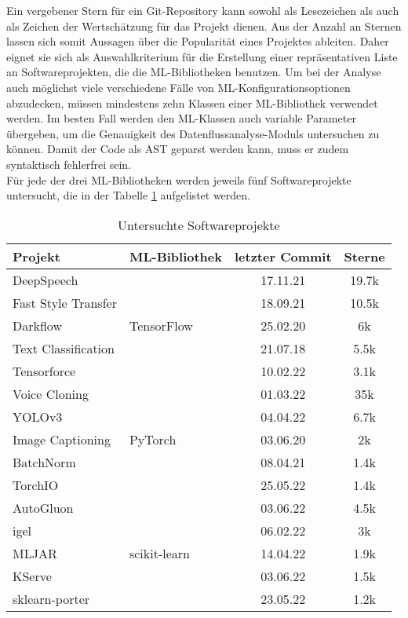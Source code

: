 \documentclass[german,bachelor]{swsLeipzig}
\begin{document}
\noindent Ein vergebener Stern für ein Git-Repository kann sowohl als Lesezeichen als auch als Zeichen der Wertschätzung für das Projekt dienen.
Aus der Anzahl an Sternen lassen sich somit Aussagen über die Popularität eines Projektes ableiten.
Daher eignet sie sich als Auswahlkriterium für die Erstellung einer repräsentativen Liste an Softwareprojekten, die die
ML-Bibliotheken benutzen.
Um bei der Analyse auch möglichst viele verschiedene Fälle von ML-Konfigurationsoptionen abzudecken, müssen mindestens zehn
Klassen einer ML-Bibliothek verwendet werden.
Im besten Fall werden den ML-Klassen auch variable Parameter übergeben, um die Genauigkeit des Datenflussanalyse-Moduls
untersuchen zu können.
Damit der Code als AST geparst werden kann, muss er zudem syntaktisch fehlerfrei sein.\\
\indent Für jede der drei ML-Bibliotheken werden jeweils fünf Softwareprojekte untersucht, die in der Tabelle \ref{projekte} aufgelistet
werden.\\

\begin{table}[H]
\small
\begin{center}
\begin{tabular}[h]{l|l|c|c}
\hline
Projekt & ML-Bibliothek & letzter Commit & Sterne \\
\hline \hline
DeepSpeech & \multirow{5}{*}{TensorFlow} & 17.11.21 & 19.7k\\
Fast Style Transfer & & 18.09.21 & 10.5k \\
Darkflow & & 25.02.20 & 6k \\
Text Classification & & 21.07.18 & 5.5k \\
Tensorforce & & 10.02.22 & 3.1k \\
\hline
Voice Cloning & \multirow{5}{*}{PyTorch} & 01.03.22 & 35k\\
YOLOv3 & & 04.04.22 & 6.7k \\
Image Captioning & & 03.06.20 & 2k \\
BatchNorm & & 08.04.21 & 1.4k \\
TorchIO & & 25.05.22 & 1.4k \\
\hline
AutoGluon & \multirow{5}{*}{scikit-learn} & 03.06.22 & 4.5k\\
igel & & 06.02.22 & 3k \\
MLJAR & & 14.04.22 & 1.9k \\
KServe & & 03.06.22 & 1.5k \\
sklearn-porter & & 23.05.22 & 1.2k \\
\hline
\end{tabular}
\caption{Untersuchte Softwareprojekte} \label{projekte}
\end{center}
\end{table}
\end{document}
